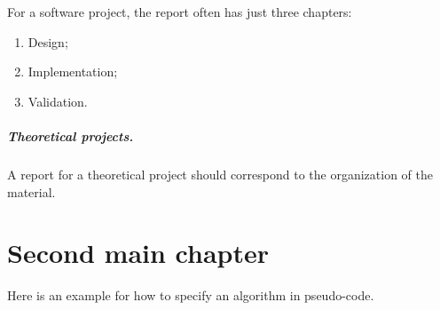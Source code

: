 \documentclass[a4paper,twoside,openright,11pt]{report}
\begin{document}
For a software project, the report often has just three chapters:
\begin{enumerate}
\item Design;
\item Implementation;
\item Validation.
\end{enumerate}


\paragraph{Theoretical projects.}

A report for a theoretical project should correspond to the organization of
the material.


\chapter{Second main chapter}

Here is an example for how to specify an algorithm in pseudo-code.

\newcommand{\str}[1]{\textsc{#1}}
\newcommand{\var}[1]{\textit{#1}}
\newcommand{\op}[1]{\textsl{#1}}
\def \ifempty#1{\def\temp{#1} \ifx\temp\empty }
\newcommand{\msg}[2]{\ensuremath{\ifempty{#2} [\str{#1}] \else [\str{#1}, {#2}] \fi}}
\newcommand{\tup}[1]{\ensuremath{\langle #1 \rangle}}
\newcommand{\nil}{\ensuremath{\bot}}
\newcommand{\false}{\textsc{false}\xspace}
\newcommand{\true}{\textsc{true}\xspace}

\newcommand\lastts{\var{lastts}\xspace}
\newcommand\nextts{\var{nextts}\xspace}
\newcommand\trusted{\var{trusted}\xspace}
\newcommand\newepoch{\var{newepoch}\xspace}
\newcommand\leader{\var{leader}\xspace}
\newcommand\ts{\var{ts}\xspace}
\newcommand{\CK}{\ensuremath{\mathcal{K}}\xspace}
\newcommand{\CP}{\ensuremath{\mathcal{P}}\xspace}
\newcommand{\CQ}{\ensuremath{\mathcal{Q}}\xspace}
\end{document}
